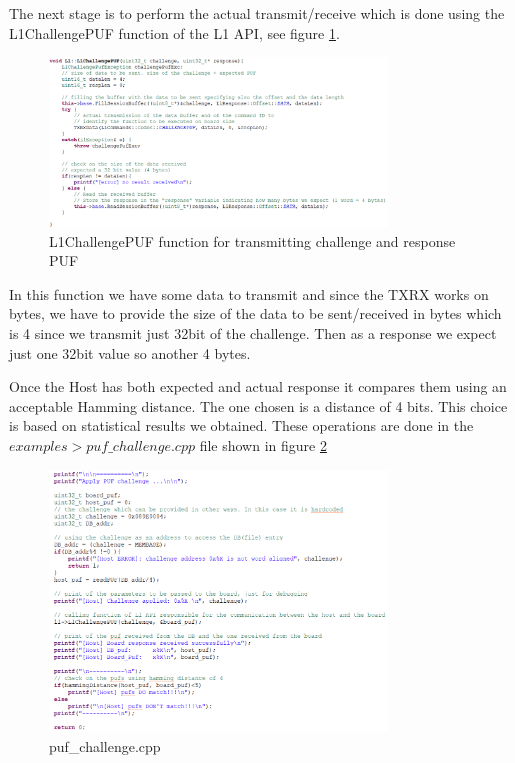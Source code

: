 The next stage is to perform the actual transmit/receive which is done using the L1ChallengePUF function of the L1 API, see figure \ref{fig:L1ChallengePUF}.

\begin{figure}[h!]
	\vspace{0.5cm}
	\includegraphics[width = 0.8\textwidth]{images/L1ChallengePUF.png}
	\caption{L1ChallengePUF function for transmitting challenge and response PUF}
	\label{fig:L1ChallengePUF}
\end{figure}


In this function we have some data to transmit and since the TXRX works on bytes, we have to provide the size of the data to be sent/received in bytes which is 4 since we transmit just 32bit of the challenge. Then as a response we expect just one 32bit value so another 4 bytes.

Once the Host has both expected and actual response it compares them using an acceptable Hamming distance. The one chosen is a distance of 4 bits. This choice is based on statistical results we obtained. These operations are done in the $examples > puf\_challenge.cpp$ file shown in figure \ref{fig:puf_challenge.cpp}

\begin{figure}[h!]
	\vspace{0.5cm}
	\includegraphics[width = 0.8\textwidth]{images/puf_challenge.png}
	\caption{puf\_challenge.cpp}
	\label{fig:puf_challenge.cpp}
\end{figure}

